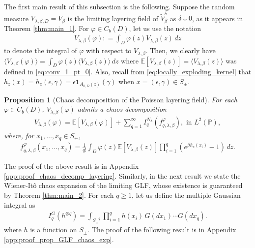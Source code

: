 \documentclass[a4paper, 11pt, reqno]{amsart}
\theoremstyle{definition} \newtheorem{defn}{Definition}[section]
\theoremstyle{remark} \newtheorem{rem}[defn]{Remark}
\theoremstyle{remark} \newtheorem*{rem*}{Remark}
\theoremstyle{plain} \newtheorem{thm}[defn]{Theorem}
\theoremstyle{plain} \newtheorem{lem}[defn]{Lemma}
\theoremstyle{plain} \newtheorem{prop}[defn]{Proposition}
\theoremstyle{plain} \newtheorem{cor}[defn]{Corollary}
\theoremstyle{remark} \newtheorem{exm}[defn]{\textbf{Example}}
\theoremstyle{remark} \newtheorem{exms}[defn]{\textbf{Examples}}
\theoremstyle{remark} \newtheorem*{bl}{}
\numberwithin{equation}{section} %
\newcommand{\pr}{\mathbb{P}}
\newcommand{\E}{\mathbb{E}}
\newcommand{\ind}{\mathbf{1}}
\begin{document}
    The first main result of this subsection is the following. Suppose the random measure $V_{\lambda, \beta, D} = V_{\beta}$ is the limiting layering field of $\tilde{V}^{\delta}_{\beta}$ as $\delta \downarrow 0$, as it appears in Theorem \ref{thm:main_1}. For $\varphi \in C_b(D)$, let us use the notation 
	\begin{align}\label{eq:chaos_decomp_layering_1.5}
			V_{\lambda, \beta} (\varphi) : = \int_D \varphi(z) V_{\lambda, \beta} (z) \, dz
	\end{align}
	to denote the integral of $\varphi$ with respect to $V_{\lambda, \beta}$. Then, we clearly have 
    $\langle V_{\lambda, \beta} (\varphi) \rangle = \int_D \varphi(z) \langle V_{\lambda, \beta} (z) \rangle \, dz$ where $\E [V_{\lambda, \beta} (z)]  = \langle V_{\lambda, \beta}(z) \rangle$ was defined in \eqref{eq:conv_1_pt_0}. Also, recall from \eqref{eq:locally_exploding_kernel} that $h_z (x)  = h_z(\epsilon, \gamma) = \epsilon \ind_{A_{0, D}(z)}(\gamma)$ when $x = (\epsilon, \gamma) \in S_{\pm}$.
	
	\begin{prop}[Chaos decomposition of the Poisson layering field]\label{prop:chaos_decomp_layering}
		For each $\varphi \in C_b(D)$,  $V_{\lambda, \beta}(\varphi)$ admits a chaos decomposition 
		\begin{align}\label{eq:chaos_decomp_layering_1}
			V_{\lambda, \beta} (\varphi) = \E [V_{\lambda, \beta} (\varphi)] + \sum_{q=1}^{\infty} I^{N_{\lambda}}_q (f^{\varphi}_{q, \lambda, \beta}), \text{ in } L^2(\pr),
		\end{align} 
		where, for $x_1, \ldots, x_q \in S_{\pm}$,
		\begin{align}\label{eq:chaos_decomp_layering_2}
			f^{\varphi}_{q, \lambda, \beta}(x_1, \ldots, x_q) = \frac{1}{q!}\int_D \varphi(z) \E [V_{\lambda, \beta} (z)] \prod_{i=1}^q \left(e^{\beta h_z(x_i)} -1 \right) \, dz.
		\end{align} 		
	\end{prop}	
    The proof of the above result is in Appendix \ref{app:proof_chaos_decomp_layering}. Similarly, in the next result we state the Wiener-It\^{o} chaos expansion of the limiting GLF, whose existence is guaranteed by Theorem \ref{thm:main_2}. For each $q\ge 1$, let us define the multiple Gaussian integral as
	\begin{align}\label{eq:mult_Gaussian_integrals}
		I^G_q (h^{\otimes q}) = \int_{{S_{\pm}}^q} \prod_{i=1}^q h(x_i) \, G(dx_1) \cdots G(dx_q).
	\end{align} 
    where $h$ is a function on $S_{\pm}$. The proof of the following result is in Appendix \ref{app:proof_prop_GLF_chaos_exp}.
    
\end{document}
